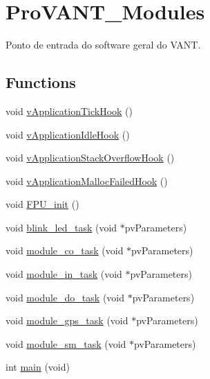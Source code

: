 \hypertarget{group__ProVANT__Modules}{}\section{Pro\+V\+A\+N\+T\+\_\+\+Modules}
\label{group__ProVANT__Modules}


Ponto de entrada do software geral do V\+A\+NT.  


\subsection*{Functions}
\begin{DoxyCompactItemize}
\item 
void \hyperlink{group__ProVANT__Modules_ga2850b09d1bb227364b5ff6de6f85f740}{v\+Application\+Tick\+Hook} ()
\item 
void \hyperlink{group__ProVANT__Modules_ga11cbdd335da884dec1204e230554bfd9}{v\+Application\+Idle\+Hook} ()
\item 
void \hyperlink{group__ProVANT__Modules_ga8f5b98d87cfd1379b8d6573159bcbdd3}{v\+Application\+Stack\+Overflow\+Hook} ()
\item 
void \hyperlink{group__ProVANT__Modules_ga73f6aa45470ada02a5d6f3a522d8f13c}{v\+Application\+Malloc\+Failed\+Hook} ()
\item 
void \hyperlink{group__ProVANT__Modules_ga73e2a1fcfc7e7f2bb22937e543997019}{F\+P\+U\+\_\+init} ()
\item 
void \hyperlink{group__ProVANT__Modules_ga39e7a5088757fe328c0162fe25d907bf}{blink\+\_\+led\+\_\+task} (void $\ast$pv\+Parameters)
\item 
void \hyperlink{group__ProVANT__Modules_gab0c5d271dba436247302632e599731ba}{module\+\_\+co\+\_\+task} (void $\ast$pv\+Parameters)
\item 
void \hyperlink{group__ProVANT__Modules_ga7de15cbee9a0ca9eafb3eb25f5e3d691}{module\+\_\+in\+\_\+task} (void $\ast$pv\+Parameters)
\item 
void \hyperlink{group__ProVANT__Modules_ga466679da7a6953ce332271681ce397c7}{module\+\_\+do\+\_\+task} (void $\ast$pv\+Parameters)
\item 
void \hyperlink{group__ProVANT__Modules_gac55e5b60dffafe957dddc7aa452bfa9d}{module\+\_\+gps\+\_\+task} (void $\ast$pv\+Parameters)
\item 
void \hyperlink{group__ProVANT__Modules_gaad8bcaa035ca56eddd3ccbf522298711}{module\+\_\+sm\+\_\+task} (void $\ast$pv\+Parameters)
\item 
int \hyperlink{group__ProVANT__Modules_ga840291bc02cba5474a4cb46a9b9566fe}{main} (void)
\end{DoxyCompactItemize}


